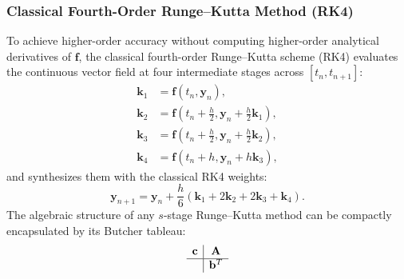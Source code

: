 \documentclass[11pt,a4paper]{article}
\theoremstyle{definition}
\theoremstyle{remark}
\begin{document}
\subsubsection{Classical Fourth-Order Runge--Kutta Method (RK4)}
To achieve higher-order accuracy without computing higher-order analytical derivatives of $\mathbf{f}$, the classical fourth-order Runge--Kutta scheme (RK4) evaluates the continuous vector field at four intermediate stages across $[t_n, t_{n+1}]$:
\begin{align}
\mathbf{k}_1 &= \mathbf{f}(t_n, \mathbf{y}_n), \label{eq:rk4_k1} \\
\mathbf{k}_2 &= \mathbf{f}\left(t_n + \frac{h}{2}, \mathbf{y}_n + \frac{h}{2}\mathbf{k}_1\right), \label{eq:rk4_k2} \\
\mathbf{k}_3 &= \mathbf{f}\left(t_n + \frac{h}{2}, \mathbf{y}_n + \frac{h}{2}\mathbf{k}_2\right), \label{eq:rk4_k3} \\
\mathbf{k}_4 &= \mathbf{f}(t_n + h, \mathbf{y}_n + h\mathbf{k}_3), \label{eq:rk4_k4}
\end{align}
and synthesizes them with the classical RK4 weights:
\begin{equation}
\label{eq:rk4_update}
\mathbf{y}_{n+1} = \mathbf{y}_n + \frac{h}{6} \left(\mathbf{k}_1 + 2\mathbf{k}_2 + 2\mathbf{k}_3 + \mathbf{k}_4\right).
\end{equation}
The algebraic structure of any $s$-stage Runge--Kutta method can be compactly encapsulated by its Butcher tableau:
\begin{equation}
\label{eq:butcher_general}
\begin{array}{c|c}
\mathbf{c} & \mathbf{A} \\
\hline
& \mathbf{b}^T
\end{array}
\end{equation}
\end{document}
